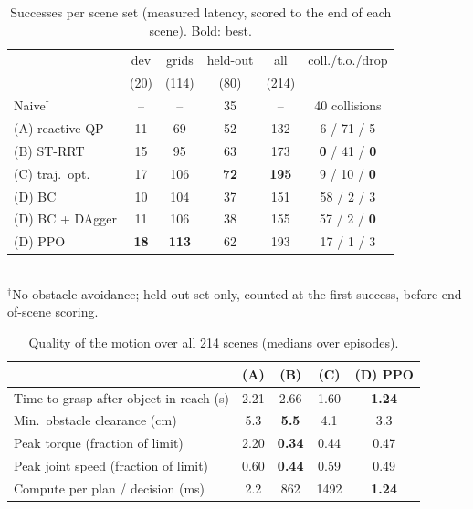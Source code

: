 \documentclass[conference]{IEEEtran}
\begin{document}
\begin{table}[t]
  \centering
  \caption{Successes per scene set (measured latency, scored to the end of each scene). Bold: best.}
  \label{tab:success}
  \setlength{\tabcolsep}{3pt}\small
  \begin{tabular}{@{}lccccc@{}}
    \toprule
    & dev & grids & held-out & all & coll./t.o./drop \\
    & (20) & (114) & (80) & (214) & \\
    \midrule
    Naive$^\dagger$ & -- & -- & 35 & -- & 40 collisions \\
    (A) reactive QP     & 11 & 69  & 52 & 132 & 6 / 71 / 5 \\
    (B) ST-RRT  & 15 & 95  & 63 & 173 & \textbf{0} / 41 / \textbf{0} \\
    (C) traj.\ opt. & 17 & 106 & \textbf{72} & \textbf{195} & 9 / 10 / \textbf{0} \\
    \midrule
    (D) BC              & 10 & 104 & 37 & 151 & 58 / 2 / 3 \\
    (D) BC + DAgger     & 11 & 106 & 38 & 155 & 57 / 2 / \textbf{0} \\
    (D) PPO             & \textbf{18} & \textbf{113} & 62 & 193 & 17 / 1 / 3 \\
    \bottomrule
  \end{tabular}\\[2pt]
  {\footnotesize $^\dagger$No obstacle avoidance; held-out set only, counted at the first success, before end-of-scene scoring.}
\end{table}

\begin{table}[t]
  \centering
  \caption{Quality of the motion over all 214 scenes (medians over episodes).}
  \label{tab:quality}
  \setlength{\tabcolsep}{3.5pt}
  \begin{tabular}{@{}lcccc@{}}
    \toprule
    & (A) & (B) & (C) & (D) PPO \\
    \midrule
    Time to grasp after object in reach (s)  & 2.21 & 2.66 & 1.60 & \textbf{1.24} \\
    Min.\ obstacle clearance (cm)            & 5.3  & \textbf{5.5} & 4.1 & 3.3 \\
    Peak torque (fraction of limit)          & 2.20 & \textbf{0.34} & 0.44 & 0.47 \\
    Peak joint speed (fraction of limit)     & 0.60 & \textbf{0.44} & 0.59 & 0.49 \\
    Compute per plan / decision (ms)         & 2.2  & 862  & 1492 & \textbf{1.24} \\
    \bottomrule
  \end{tabular}
\end{table}
\end{document}

